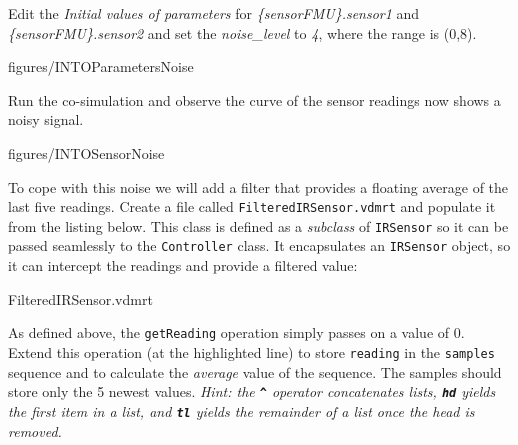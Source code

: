 \documentclass[11pt,a4paper]{../tutorial}
\begin{document}
\begin{instructions}

\item Edit the \emph{Initial values of parameters} for \emph{\{sensorFMU\}.sensor1} and \emph{\{sensorFMU\}.sensor2} and set the \emph{noise\_level} to \emph{4}, where the range is (0,8).

    \begin{annotation}[width=0.85\linewidth,trim=0 0 0 0,clip]{figures/INTOParametersNoise}
    \end{annotation}

\newpage
\item Run the co-simulation and observe the curve of the sensor readings now shows a noisy signal.

    \begin{annotation}[width=0.85\linewidth,trim=0 0 0 0,clip]{figures/INTOSensorNoise}
    \end{annotation}

\item To cope with this noise we will add a filter that provides a floating average of the last five readings. Create a file called \texttt{FilteredIRSensor.vdmrt} and populate it from the listing below. This class is defined as a \emph{subclass} of \texttt{IRSensor} so it can be passed seamlessly to the \texttt{Controller} class. It encapsulates an \texttt{IRSensor} object, so it can intercept the readings and provide a filtered value:

    \bigskip
    
    {FilteredIRSensor.vdmrt}

\item As defined above, the \texttt{getReading} operation simply passes on a value of 0. Extend this operation (at the highlighted line) to store \texttt{reading} in the \texttt{samples} sequence and to calculate the \emph{average} value of the sequence. The samples should store only the 5 newest values. \emph{Hint: the \texttt{\textbf{\^}} operator concatenates lists, \texttt{\textbf{hd}} yields the first item in a list, and \texttt{\textbf{tl}} yields the remainder of a list once the head is removed.}


\end{instructions}
\end{document}
